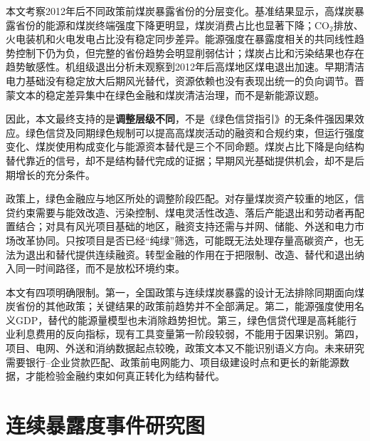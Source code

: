 \documentclass[UTF8,12pt]{ctexart}
\begin{document}
本文考察2012年后不同政策前煤炭暴露省份的分层变化。基准结果显示，高煤炭暴露省份的能源和煤炭终端强度下降更明显，煤炭消费占比也显著下降；CO$_2$排放、火电装机和火电发电占比没有稳定同步差异。能源强度在暴露度相关的共同线性趋势控制下仍为负，但完整的省份趋势会明显削弱估计；煤炭占比和污染结果也存在趋势敏感性。机组级退出分析未观察到2012年后高煤地区煤电退出加速。早期清洁电力基础没有稳定放大后期风光替代，资源依赖也没有表现出统一的负向调节。晋蒙文本的稳定差异集中在绿色金融和煤炭清洁治理，而不是新能源议题。

因此，本文最终支持的是\textbf{调整层级不同}，不是《绿色信贷指引》的无条件强因果效应。绿色信贷及同期绿色规制可以提高高煤炭活动的融资和合规约束，但运行强度变化、煤炭使用构成变化与能源资本替代是三个不同命题。煤炭占比下降是向结构替代靠近的信号，却不是结构替代完成的证据；早期风光基础提供机会，却不是后期增长的充分条件。

政策上，绿色金融应与地区所处的调整阶段匹配。对存量煤炭资产较重的地区，信贷约束需要与能效改造、污染控制、煤电灵活性改造、落后产能退出和劳动者再配置结合；对具有风光项目基础的地区，融资支持还需与并网、储能、外送和电力市场改革协同。只按项目是否已经“纯绿”筛选，可能既无法处理存量高碳资产，也无法为退出和替代提供连续融资。转型金融的作用在于把限制、改造、替代和退出纳入同一时间路径，而不是放松环境约束。

本文有四项明确限制。第一，全国政策与连续煤炭暴露的设计无法排除同期面向煤炭省份的其他政策；关键结果的政策前趋势并不全部满足。第二，能源强度使用名义GDP，替代的能源量模型也未消除趋势担忧。第三，绿色信贷代理是高耗能行业利息费用的反向指标，现有工具变量第一阶段较弱，不能用于因果识别。第四，项目、电网、外送和消纳数据起点较晚，政策文本又不能识别语义方向。未来研究需要银行--企业贷款匹配、政策前电网能力、项目级建设时点和更长的新能源数据，才能检验金融约束如何真正转化为结构替代。

\appendix
\section{连续暴露度事件研究图}
\end{document}
